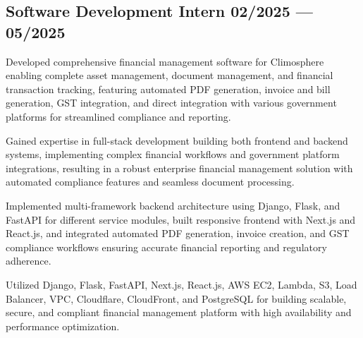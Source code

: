 \subsection{{Software Development Intern \hfill 02/2025 --- 05/2025}}
\begin{zitemize}
    \item Developed comprehensive financial management software for Climosphere enabling complete asset management, document management, and financial transaction tracking, featuring automated PDF generation, invoice and bill generation, GST integration, and direct integration with various government platforms for streamlined compliance and reporting.
    \item Gained expertise in full-stack development building both frontend and backend systems, implementing complex financial workflows and government platform integrations, resulting in a robust enterprise financial management solution with automated compliance features and seamless document processing.
    \item Implemented multi-framework backend architecture using Django, Flask, and FastAPI for different service modules, built responsive frontend with Next.js and React.js, and integrated automated PDF generation, invoice creation, and GST compliance workflows ensuring accurate financial reporting and regulatory adherence.
    \item Utilized Django, Flask, FastAPI, Next.js, React.js, AWS EC2, Lambda, S3, Load Balancer, VPC, Cloudflare, CloudFront, and PostgreSQL for building scalable, secure, and compliant financial management platform with high availability and performance optimization.
\end{zitemize}

